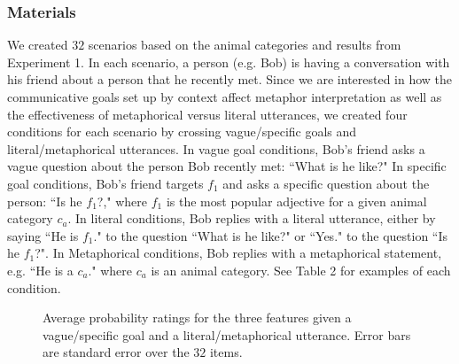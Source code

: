 \documentclass[10pt,letterpaper]{article}
\begin{document}
\subsubsection{Materials}
We created $32$ scenarios based on the animal categories and results from Experiment 1. In each scenario, a person (e.g. Bob) is having a conversation with his friend about a person that he recently met. Since we are interested in how the communicative goals set up by context affect metaphor interpretation as well as the effectiveness of metaphorical versus literal utterances, we created four conditions for each scenario by crossing vague/specific goals and literal/metaphorical utterances. In vague goal conditions, Bob's friend asks a vague question about the person Bob recently met: ``What is he like?" In specific goal conditions, Bob's friend targets $f_1$ and asks a specific question about the person: ``Is he $f_1$?," where $f_1$ is the most popular adjective for a given animal category $c_a$. In literal conditions, Bob replies with a literal utterance, either by saying ``He is $f_1$." to the question ``What is he like?" or ``Yes." to the question ``Is he $f_1$?". In Metaphorical conditions, Bob replies with a metaphorical statement, e.g. ``He is a $c_a$." where $c_a$ is an animal category. See Table 2 for examples of each condition.

\begin{figure}[t]
\begin{center}
\end{center}
\caption{Average probability ratings for the three features given a vague/specific goal and a literal/metaphorical utterance. Error bars are standard error over the $32$ items.} 
\label{human_bar}
\end{figure}
\end{document}
